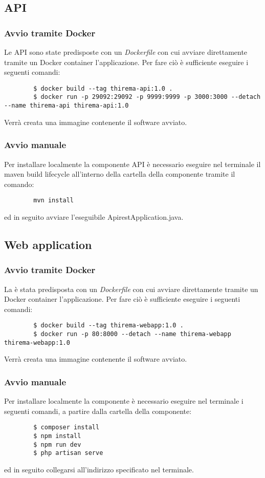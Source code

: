 	\subsection{API}

		\subsubsection{Avvio tramite Docker}
		Le API sono state predisposte con un \textit{Dockerfile} con cui avviare direttamente tramite un Docker container l'applicazione. Per fare ciò è sufficiente eseguire i seguenti comandi:
		\begin{verbatim}
		$ docker build --tag thirema-api:1.0 .
		$ docker run -p 29092:29092 -p 9999:9999 -p 3000:3000 --detach --name thirema-api thirema-api:1.0
		\end{verbatim}
		Verrà creata una immagine contenente il software avviato.

		\subsubsection{Avvio manuale}
		Per installare localmente la componente API è necessario eseguire nel terminale il maven build lifecycle all'interno della cartella della componente tramite il comando:
		\begin{verbatim}
		mvn install
		\end{verbatim}
		ed in seguito avviare l'eseguibile ApirestApplication.java.

	\subsection{Web application}

		\subsubsection{Avvio tramite Docker}
		La  è stata predisposta con un \textit{Dockerfile} con cui avviare direttamente tramite un Docker container l'applicazione. Per fare ciò è sufficiente eseguire i seguenti comandi:
		\begin{verbatim}
		$ docker build --tag thirema-webapp:1.0 .
		$ docker run -p 80:8000 --detach --name thirema-webapp thirema-webapp:1.0
		\end{verbatim}
		Verrà creata una immagine contenente il software avviato.

		\subsubsection{Avvio manuale}
		Per installare localmente la componente  è necessario eseguire nel terminale i seguenti comandi, a partire dalla cartella della componente:
		\begin{verbatim}
		$ composer install
		$ npm install
		$ npm run dev
		$ php artisan serve
		\end{verbatim}
		ed in seguito collegarsi all'indirizzo specificato nel terminale.

